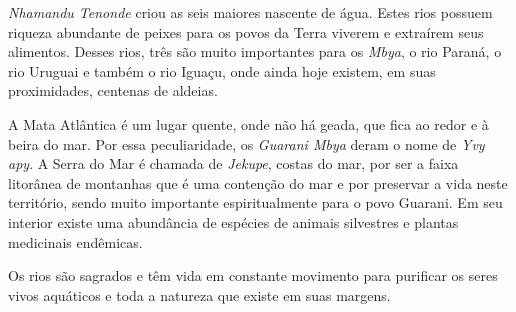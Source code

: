  

 


 

\emph{Nhamandu Tenonde} criou as seis maiores nascente de água. Estes
rios possuem riqueza abundante de peixes para os povos da Terra viverem
e extraírem seus alimentos. Desses rios, três são muito importantes para
os \emph{Mbya}, o rio Paraná, o rio Uruguai e também o rio Iguaçu, onde
ainda hoje existem, em suas proximidades, centenas de aldeias.

A Mata Atlântica é um lugar quente, onde não há geada, que fica ao redor
e à beira do mar. Por essa peculiaridade, os \emph{Guarani Mbya} deram o
nome de \emph{Yvy apy}. A Serra do Mar é chamada de \emph{Jekupe},
costas do mar, por ser a faixa litorânea de montanhas que é uma
contenção do mar e por preservar a vida neste território, sendo muito
importante espiritualmente para o povo Guarani. Em seu interior existe
uma abundância de espécies de animais silvestres e plantas medicinais
endêmicas.


 

Os rios são sagrados e têm vida em constante movimento para purificar os
seres vivos aquáticos e toda a natureza que existe em suas margens.

 
